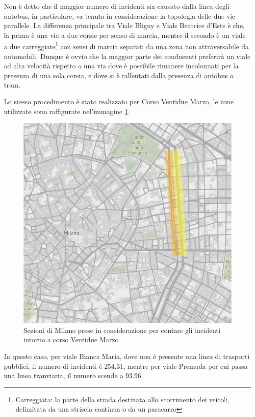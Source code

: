 \documentclass[a4paper,12pt]{report}
\begin{document}
Non è detto che il maggior numero di incidenti sia causato dalla linea degli autobus, 
in particolare, va tenuta in considerazione la topologia delle due vie parallele.
La differenza principale tra Viale Bligny e Viale Beatrice d'Este è che, la prima è una via a due 
corsie per senso di marcia, mentre il secondo è un viale a due 
carreggiate\footnote{Carreggiata: la parte della strada destinata allo scorrimento dei veicoli, 
delimitata da una striscia continua o da un paracarro} 
con sensi di marcia separati da una zona non attraversabile da automobili. 
Dunque è ovvio che la maggior parte dei conducenti preferirà un viale ad alta velocità 
rispetto a una via dove è possibile rimanere incolonnati per la presenza di una sola 
corsia, e dove si è rallentati dalla presenza di autobus o tram.

Lo stesso procedimento è stato realizzato per Corso Ventidue Marzo, le zone utilizzate sono 
raffigurate nel'immagine \ref{fig:zona-22marzo-rect}. 

\begin{figure}
    \includegraphics[width=\linewidth]{../src/atm/zona_22marzo_rect.png}
    \caption{Sezioni di Milano prese in considerazione per contare gli incidenti intorno a corso Ventidue Marzo}
    \label{fig:zona-22marzo-rect}
\end{figure}

In questo caso, per viale Bianca Maria, dove non è presente una linea di trasporti pubblici, 
il numero di incidenti è $254.31$, mentre per viale Premuda per cui passa una linea tranviaria, 
il numero scende a $93.96$.
\end{document}
